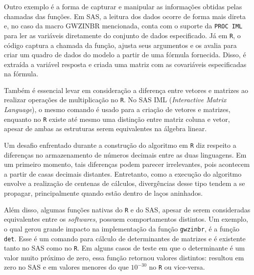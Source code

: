 \documentclass[12pt, a4paper, twoside]{report}
\numberwithin{equation}{section} %
\begin{document}
Outro exemplo é a forma de capturar e manipular as informações obtidas pelas chamadas das funções. Em SAS, a leitura dos dados ocorre de forma mais direta e, no caso da macro GWZINBR mencionada, conta com o suporte da \texttt{PROC IML} para ler as variáveis diretamente do conjunto de dados especificado. Já em \texttt{R}, o código captura a chamada da função, ajusta seus argumentos e os avalia para criar um quadro de dados do modelo a partir de uma fórmula fornecida. Disso, é extraída a variável resposta e criada uma matriz com as covariáveis especificadas na fórmula.

Também é essencial levar em consideração a diferença entre vetores e matrizes ao realizar operações de multiplicação no \texttt{R}. No SAS IML (\textit{Interactive Matrix Language}), o mesmo comando é usado para a criação de vetores e matrizes, enquanto no \texttt{R} existe até mesmo uma distinção entre matriz coluna e vetor, apesar de ambas as estruturas serem equivalentes na álgebra linear.

Um desafio enfrentado durante a construção do algoritmo em \texttt{R} diz respeito a diferenças no armazenamento de números decimais entre as duas linguagens. Em um primeiro momento, tais diferenças podem parecer irrelevantes, pois acontecem a partir de casas decimais distantes. Entretanto, como a execução do algoritmo envolve a realização de centenas de cálculos, divergências desse tipo tendem a se propagar, principalmente quando estão dentro de laços aninhados.

Além disso, algumas funções nativas do \texttt{R} e do SAS, apesar de serem consideradas equivalentes entre os \textit{softwares}, possuem comportamentos distintos. Um exemplo, o qual gerou grande impacto na implementação da função \texttt{gwzinbr}, é a função \texttt{det}. Esse é um comando para cálculo de determinantes de matrizes e é existente tanto no SAS como no \texttt{R}. Em alguns casos de teste em que o determinante é um valor muito próximo de zero, essa função retornou valores distintos: resultou em zero no SAS e em valores menores do que $10^{-30}$ no \texttt{R} ou vice-versa.

\end{document}
